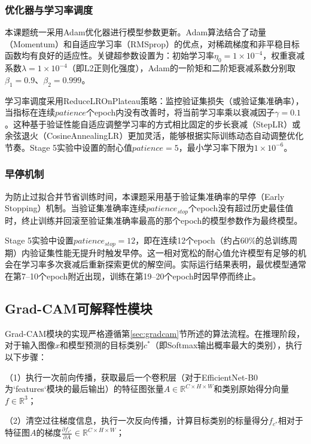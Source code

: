 \subsubsection{优化器与学习率调度}

本课题统一采用Adam优化器\cite{kingma2014adam}进行模型参数更新。Adam算法结合了动量（Momentum）和自适应学习率（RMSprop）的优点，对稀疏梯度和非平稳目标函数均有良好的适应性。关键超参数设置为：初始学习率$\eta_0 = 1 \times 10^{-4}$，权重衰减系数$\lambda = 1 \times 10^{-4}$（即L2正则化强度），Adam的一阶矩和二阶矩衰减系数分别取$\beta_1 = 0.9$、$\beta_2 = 0.999$。

学习率调度采用ReduceLROnPlateau策略：监控验证集损失（或验证集准确率），当指标在连续$patience$个epoch内没有改善时，将当前学习率乘以衰减因子$\gamma = 0.1$。这种基于验证性能自适应调整学习率的方式相比固定的步长衰减（StepLR）或余弦退火（CosineAnnealingLR）更加灵活，能够根据实际训练动态自动调整优化节奏。Stage 5实验中设置的耐心值$patience = 5$，最小学习率下限为$1 \times 10^{-6}$。

\subsubsection{早停机制}

为防止过拟合并节省训练时间，本课题采用基于验证集准确率的早停（Early Stopping）机制。当验证集准确率连续$patience_{stop}$个epoch没有超过历史最佳值时，终止训练并回滚至验证集准确率最高的那个epoch的模型参数作为最终模型。

Stage 5实验中设置$patience_{stop} = 12$，即在连续12个epoch（约占60\%的总训练周期）内验证集性能无提升时触发早停。这一相对宽松的耐心值允许模型有足够的机会在学习率多次衰减后重新探索更优的解空间。实际运行结果表明，最优模型通常在第7--10个epoch附近出现，训练在第19--20个epoch时因早停而终止。


\subsection{Grad-CAM可解释性模块}

Grad-CAM模块的实现严格遵循第\ref{sec:gradcam}节所述的算法流程。在推理阶段，对于输入图像$x$和模型预测的目标类别$c^*$（即Softmax输出概率最大的类别），执行以下步骤：

（1）执行一次前向传播，获取最后一个卷积层（对于EfficientNet-B0为`features`模块的最后输出）的特征图张量$A \in \mathbb{R}^{C \times H \times W}$和类别原始得分向量$f \in \mathbb{R}^3$；

（2）清空过往梯度信息，执行一次反向传播，计算目标类别的标量得分$f_{c^*}$相对于特征图$A$的梯度$\frac{\partial f_{c^*}}{\partial A} \in \mathbb{R}^{C \times H \times W}$；


